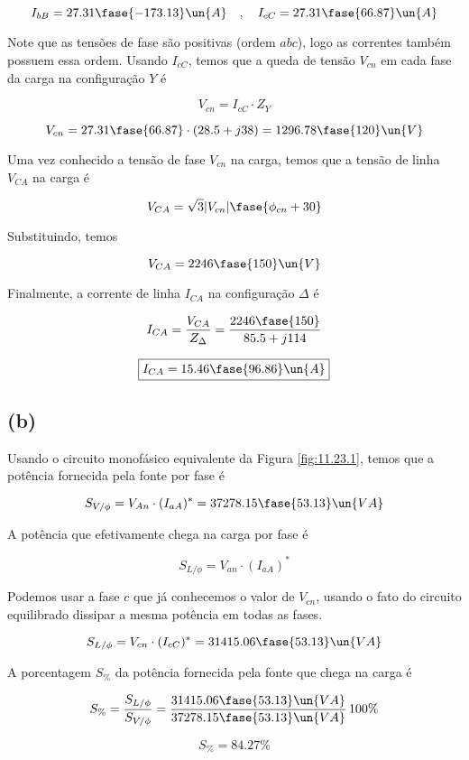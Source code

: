 \[ I_{bB} = 27.31\fase{-173.13} \un{A} \quad , \quad I_{cC} = 27.31\fase{66.87} \un{A} \]

Note que as tensões de fase são positivas (ordem $abc$), logo as correntes também possuem essa ordem.
Usando $I_{cC}$, temos que a queda de tensão $V_{cn}$ em cada fase da carga na configuração $Y$ é  

\[ V_{cn} = I_{cC} \cdot Z_Y \]

\[ V_{cn} = 27.31\fase{66.87} \cdot (28.5 +j38 ) = 1296.78\fase{120} \un{V} \]

Uma vez conhecido a tensão de fase $V_{cn}$ na carga, temos que a tensão de linha $V_{CA}$ na carga é

\begin{equation}\label{eq:11.23.2}
    V_{CA} = \sqrt{3}|V_{cn}|\fase{\phi_{cn} + 30}
\end{equation}

Substituindo, temos    

\[ V_{CA} = 2246\fase{150} \un{V} \]

Finalmente, a corrente de linha $I_{CA}$ na configuração $\Delta$ é  

\[ I_{CA} = \frac{V_{CA}}{Z_{\Delta}} = \frac{2246\fase{150}}{85.5 + j114} \]

\[ \boxed{I_{CA} = 15.46\fase{96.86} \un{A}} \]

\subsection*{(b)}

Usando o circuito monofásico equivalente da Figura \ref*{fig:11.23.1}, temos que a potência fornecida pela fonte por fase é  

\[ S_{V/\phi} = V_{An} \cdot (I_{aA})^* = 37278.15\fase{53.13} \un{VA} \]

A potência que efetivamente chega na carga por fase é 

\[ S_{L/\phi} = V_{an} \cdot (I_{aA})^* \]

Podemos usar a fase $c$ que já conhecemos o valor de $V_{cn}$, usando o fato do circuito equilibrado dissipar a mesma
potência em todas as fases.

\[ S_{L/\phi} = V_{cn} \cdot (I_{cC})^* = 31415.06\fase{53.13} \un{VA} \]

A porcentagem $S_{\%}$ da potência fornecida pela fonte que chega na carga é  

\[ S_{\%} = \frac{S_{L/\phi}}{S_{V/\phi}} = \frac{31415.06\fase{53.13} \un{VA}}{37278.15\fase{53.13} \un{VA}} \, 100\% \]

\[ \boxed{S_{\%} = 84.27\%} \]

